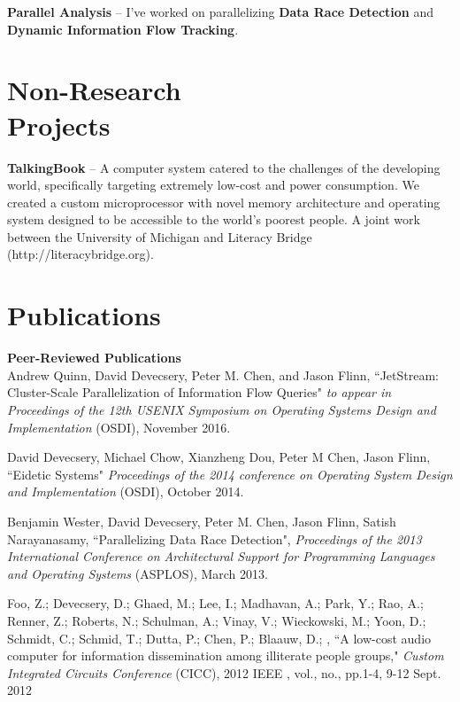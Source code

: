 \documentclass[margin, 10pt]{res} %
\begin{document}
\begin{resume}
\textbf{Parallel Analysis} -- I've worked on parallelizing
\textbf{Data Race Detection} and \textbf{Dynamic Information Flow
Tracking}.


\section{Non-Research \\ Projects}
\textbf{TalkingBook} --
A computer system catered to the challenges of the developing world,
specifically targeting extremely low-cost and power consumption.  We
created a custom microprocessor with novel memory architecture and
operating system designed to be accessible to the world's
poorest people.  A joint work between the University of Michigan and
Literacy Bridge (http://literacybridge.org).

\section{Publications}
\textbf{Peer-Reviewed Publications}\\
Andrew Quinn, David Devecsery, Peter M. Chen, and Jason Flinn,
``JetStream: Cluster-Scale Parallelization of Information Flow Queries"
{\sl to appear in Proceedings of the 12th USENIX Symposium on Operating
Systems Design and Implementation} (OSDI), November 2016.

David Devecsery, Michael Chow, Xianzheng Dou, Peter M Chen, Jason Flinn,
``Eidetic Systems" {\sl Proceedings of the 2014 conference on Operating
System Design and Implementation} (OSDI), October 2014.

Benjamin Wester, David Devecsery, Peter M. Chen, Jason Flinn, Satish
Narayanasamy, ``Parallelizing Data Race Detection", {\sl Proceedings of the
2013 International Conference on Architectural Support for Programming
Languages and Operating Systems} (ASPLOS), March 2013.

Foo, Z.; Devecsery, D.; Ghaed, M.; Lee, I.; Madhavan, A.; Park, Y.;
Rao, A.; Renner, Z.; Roberts, N.; Schulman, A.; Vinay, V.; Wieckowski,
M.; Yoon, D.; Schmidt, C.; Schmid, T.; Dutta, P.; Chen, P.; Blaauw,
D.; , ``A low-cost audio computer for information dissemination among
illiterate people groups," {\sl Custom Integrated Circuits Conference}
(CICC), 2012 IEEE , vol., no., pp.1-4, 9-12 Sept. 2012


\end{resume}
\end{document}
